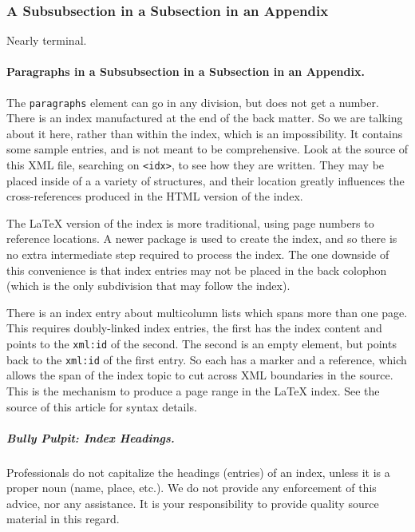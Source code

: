 \documentclass{amsart}
\theoremstyle{plain}%
\theoremstyle{definition}%
\theoremstyle{remark}%
\newcommand{\mono}[1]{\texttt{#1}}
\numberwithin{equation}{section}
\begin{document}
\subsubsection{A Subsubsection in a Subsection in an Appendix}\label{appendix-structured-3-3}%
Nearly terminal.%
\paragraph*{Paragraphs in a Subsubsection in a Subsection in an Appendix.}\label{appendix-structured-3-3-3}%
The \mono{paragraphs} element can go in any division, but does not get a number.%
%
%
\typeout{************************************************}
\typeout{************************************************}
%
\label{appendix-index}%
There is an index manufactured at the end of the back matter.  So we are talking about it here, rather than within the index, which is an impossibility.  It contains some sample entries, and is not meant to be comprehensive.  Look at the source of this XML file, searching on \mono{<idx>}, to see how they are written.  They may be placed inside of a a variety of structures, and their location greatly influences the cross-references produced in the HTML version of the index.%
\par
The \LaTeX{} version of the index is more traditional, using page numbers to reference locations.  A newer package is used to create the index, and so there is no extra intermediate step required to process the index.  The one downside of this convenience is that index entries may not be placed in the back colophon (which is the only subdivision that may follow the index).%
\par
There is an index entry about multicolumn lists which spans more than one page.  This requires doubly-linked index entries, the first has the index content and points to the \mono{xml:id} of the second.  The second is an empty element, but points back to the \mono{xml:id} of the first entry.  So each has a marker and a reference, which allows the span of the index topic to cut across XML boundaries in the source.  This is the mechanism to produce a page range in the \LaTeX{} index.  See the source of this article for syntax details.%
\subparagraph*{Bully Pulpit: Index Headings.}\label{appendix-index-5}%
Professionals do not capitalize the headings (entries) of an index, unless it is a proper noun (name, place, etc.\@).  We do not provide any enforcement of this advice, nor any assistance.  It is your responsibility to provide quality source material in this regard.%
\end{document}
